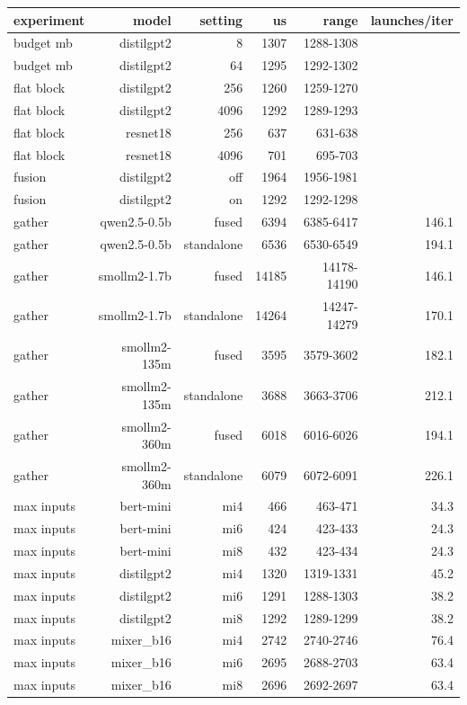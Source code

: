 \begin{tabular}{lrrrrr}
\toprule
experiment & model & setting & us & range & launches/iter \\
\midrule
budget mb & distilgpt2 & 8 & 1307 & 1288-1308 &  \\
budget mb & distilgpt2 & 64 & 1295 & 1292-1302 &  \\
flat block & distilgpt2 & 256 & 1260 & 1259-1270 &  \\
flat block & distilgpt2 & 4096 & 1292 & 1289-1293 &  \\
flat block & resnet18 & 256 & 637 & 631-638 &  \\
flat block & resnet18 & 4096 & 701 & 695-703 &  \\
fusion & distilgpt2 & off & 1964 & 1956-1981 &  \\
fusion & distilgpt2 & on & 1292 & 1292-1298 &  \\
gather & qwen2.5-0.5b & fused & 6394 & 6385-6417 & 146.1 \\
gather & qwen2.5-0.5b & standalone & 6536 & 6530-6549 & 194.1 \\
gather & smollm2-1.7b & fused & 14185 & 14178-14190 & 146.1 \\
gather & smollm2-1.7b & standalone & 14264 & 14247-14279 & 170.1 \\
gather & smollm2-135m & fused & 3595 & 3579-3602 & 182.1 \\
gather & smollm2-135m & standalone & 3688 & 3663-3706 & 212.1 \\
gather & smollm2-360m & fused & 6018 & 6016-6026 & 194.1 \\
gather & smollm2-360m & standalone & 6079 & 6072-6091 & 226.1 \\
max inputs & bert-mini & mi4 & 466 & 463-471 & 34.3 \\
max inputs & bert-mini & mi6 & 424 & 423-433 & 24.3 \\
max inputs & bert-mini & mi8 & 432 & 423-434 & 24.3 \\
max inputs & distilgpt2 & mi4 & 1320 & 1319-1331 & 45.2 \\
max inputs & distilgpt2 & mi6 & 1291 & 1288-1303 & 38.2 \\
max inputs & distilgpt2 & mi8 & 1292 & 1289-1299 & 38.2 \\
max inputs & mixer\_b16 & mi4 & 2742 & 2740-2746 & 76.4 \\
max inputs & mixer\_b16 & mi6 & 2695 & 2688-2703 & 63.4 \\
max inputs & mixer\_b16 & mi8 & 2696 & 2692-2697 & 63.4 \\

\end{tabular}
